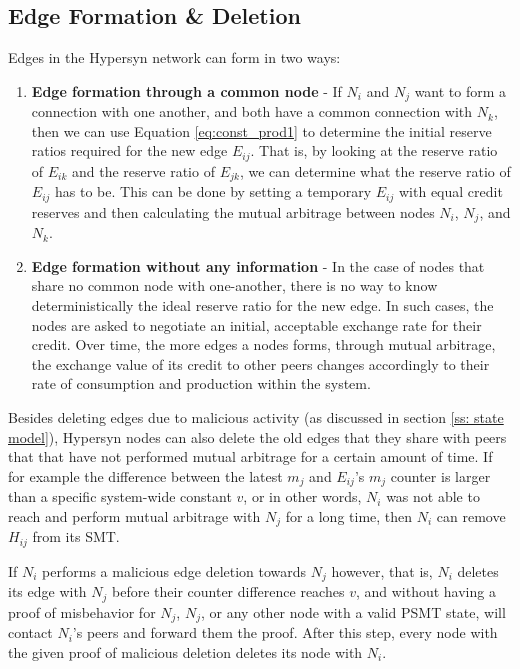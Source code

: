 \documentclass{article}
\begin{document}
\subsection{Edge Formation \& Deletion}
\label{ss: edge formation}

Edges in the Hypersyn network can form in two ways:
\begin{enumerate}
    \item \textbf{Edge formation through a common node} - If $N_i$ and $N_j$ want to form a connection with one another, and both have a common connection with $N_k$, then we can use Equation \ref{eq:const_prod1} to determine the initial reserve ratios required for the new edge $E_{ij}$. That is, by looking at the reserve ratio of $E_{ik}$ and the reserve ratio of $E_{jk}$, we can determine what the reserve ratio of $E_{ij}$ has to be. This can be done by setting a temporary $E_{ij}$ with equal credit reserves and then calculating the mutual arbitrage between nodes $N_i$, $N_j$, and $N_k$.
    
    \item \textbf{Edge formation without any information} - In the case of nodes that share no common node with one-another, there is no way to know deterministically the ideal reserve ratio for the new edge. In such cases, the nodes are asked to negotiate an initial, acceptable exchange rate for their credit. Over time, the more edges a nodes forms, through mutual arbitrage, the exchange value of its credit to other peers changes accordingly to their rate of consumption and production within the system.
\end{enumerate}

Besides deleting edges due to malicious activity (as discussed in section \ref{ss: state model}), Hypersyn nodes can also delete the old edges that they share with peers that that have not performed mutual arbitrage for a certain amount of time. If for example the difference between the latest $m_j$ and $E_{ij}$'s $m_j$ counter is larger than a specific system-wide constant $v$, or in other words, $N_i$ was not able to reach and perform mutual arbitrage with $N_j$ for a long time, then $N_i$ can remove $H_{ij}$ from its SMT.

If $N_i$ performs a malicious edge deletion towards $N_j$ however, that is, $N_i$ deletes its edge with $N_j$ before their counter difference reaches $v$, and without having a proof of misbehavior for $N_j$, $N_j$, or any other node with a valid PSMT state, will contact $N_i$'s peers and forward them the proof. After this step, every node with the given proof of malicious deletion deletes its node with $N_i$. 
\end{document}
